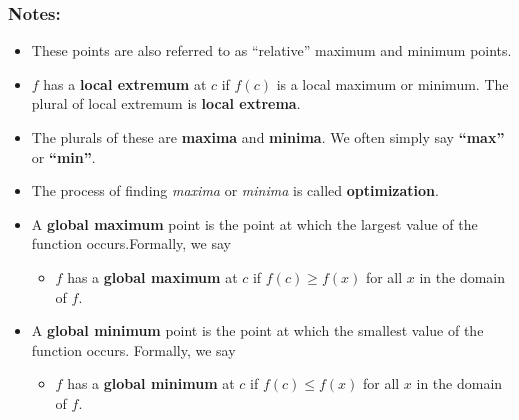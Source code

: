 \subsubsection*{Notes:}
\begin{itemize}
    \item These points are also referred to as “relative” maximum and minimum points.
    \item $f$ has a \textbf{local extremum} at $c$ if $f(c)$ is a local maximum or minimum. The plural of local extremum is \textbf{local extrema}.
    \item The plurals of these are \textbf{maxima} and \textbf{minima}. We often simply say \textbf{“max”} or \textbf{“min”}.
    \item The process of finding \emph{maxima} or \emph{minima} is called \textbf{optimization}.
\end{itemize}
\vspace{1in}
\begin{tcolorbox}[title = {Global Extreme Points }]
\begin{itemize}[leftmargin=*]
\item A \textbf{global maximum} point is the point at which the largest value of the function occurs.Formally, we say
    \begin{itemize}
        \item $f$ has a \textbf{global maximum} at $c$ if $f(c)\ge f(x)$ for all $x$ in the domain of $f$.
    \end{itemize}
\item A \textbf{global minimum} point is the point at which the smallest value of the function occurs. Formally, we say
    \begin{itemize}
        \item $f$ has a \textbf{global minimum} at $c$ if $f(c)\le f(x)$ for all $x$ in the domain of $f$.
    \end{itemize}
\end{itemize}
\end{tcolorbox}
\vspace{-0.5cm}
